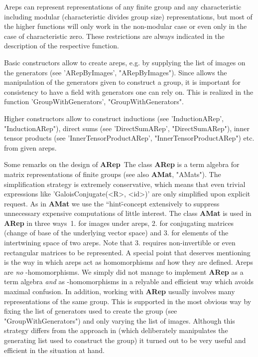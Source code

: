 Areps can represent representations of any finite group and any
characteristic including modular (characteristic divides group size)
representations, but most of the higher functions will only work 
in the non-modular case or even only in the case of characteristic zero.
These restrictions are always indicated in the description of the
respective function.

Basic constructors allow to create areps, e.g. by supplying
the list of images on the generators (see 'ARepByImages', 
"ARepByImages"). Since {\GAP} allows the manipulation of 
the generators given to construct a group, it is important
for consistency to have a field with generators one can rely on.
This is realized in the function 'GroupWithGenerators', 
"GroupWithGenerators".

Higher constructors allow to construct inductions (see 'InductionARep',
"InductionARep"), direct sums (see 'DirectSumARep', "DirectSumARep"), 
inner tensor products (see 'InnerTensorProductARep',
"InnerTensorProductARep") etc. from given areps.

Some remarks on the design of {\bf ARep}\:\ 
The class {\bf ARep} is a term algebra for matrix representations
of finite groups (see also {\bf AMat}, "AMats").
The simplification strategy is extremely conservative, 
which means that even trivial expressions like 
'GaloisConjugate(<R>, <id>)' are only simplified upon 
explicit request. 
As in {\bf AMat} we use the ``hint\"-concept extensively 
to suppress unnecessary expensive computations of little interest.
The class {\bf AMat} is used in {\bf ARep} in three ways\:\ 
1. for images under areps, 2. for conjugating matrices 
(change of base of the underlying vector space) and 3. for elements
of the intertwining space of two areps.
Note that 3. requires non-invertible or even rectangular matrices 
to be represented.
A special point that deserves mentioning is the way in which areps 
act as homomorphisms anf how they are defined. Areps are {\em no} 
{\GAP}-homomorphisms. We simply did not manage to implement 
{\bf ARep} as a term algebra {\em and} as {\GAP}-homomorphisms
in a relyable and efficient way which avoids maximal confusion. 
In addition, working with {\bf ARep} usually involves many 
representations of the same group. This is supported in the 
most obvious way by fixing the list of generators used to 
create the group (see "GroupWithGenerators") and only varying 
the list of images. Although this strategy differs from the 
approach in {\GAP} (which deliberately manipulates the 
generating list used to construct the group) it turned out
to be very useful and efficient in the situation at hand.

